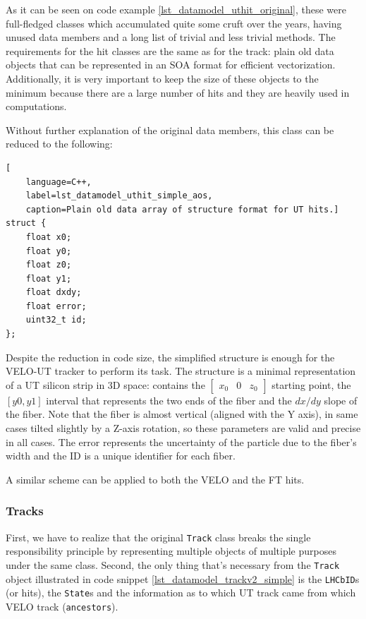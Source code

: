 \documentclass[12pt]{article}
\newcommand{\code}[1]{\texttt{#1}}
\begin{document}
As it can be seen on code example \ref{lst_datamodel_uthit_original}, these were full-fledged classes which accumulated quite some cruft over the years, having unused data members and a long list of trivial and less trivial methods. The requirements for the hit classes are the same as for the track: plain old data objects that can be represented in an SOA format for efficient vectorization. Additionally, it is very important to keep the size of these objects to the minimum because there are a large number of hits and they are heavily used in computations.

\vspace{1pc}

Without further explanation of the original data members, this class can be reduced to the following:

\begin{lstlisting}[
	language=C++,
	label=lst_datamodel_uthit_simple_aos,
	caption=Plain old data array of structure format for UT hits.]
struct {
	float x0;
	float y0;
	float z0;
	float y1;
	float dxdy;
	float error;
	uint32_t id;
};
\end{lstlisting}

Despite the reduction in code size, the simplified structure is enough for the VELO-UT tracker to perform its task. The structure is a minimal representation of a UT silicon strip in 3D space: contains the 
$\begin{bmatrix}
	x_0 & 0 & z_0
\end{bmatrix}$
starting point, the $[y0, y1]$ interval that represents the two ends of the fiber and the $dx/dy$ slope of the fiber. Note that the fiber is almost vertical (aligned with the Y axis), in same cases tilted slightly by a Z-axis rotation, so these parameters are valid and precise in all cases. The error represents the uncertainty of the particle due to the fiber's width and the ID is a unique identifier for each fiber.

\vspace{1pc}

A similar scheme can be applied to both the VELO and the FT hits.


\subsubsection{Tracks}

First, we have to realize that the original \code{Track} class breaks the single responsibility principle by representing multiple objects of multiple purposes under the same class. Second, the only thing that's necessary from the \code{Track} object illustrated in code snippet \ref{lst_datamodel_trackv2_simple} is the \code{LHCbID}s (or hits), the \code{State}s and the information as to which UT track came from which VELO track (\code{ancestors}).
\end{document}
